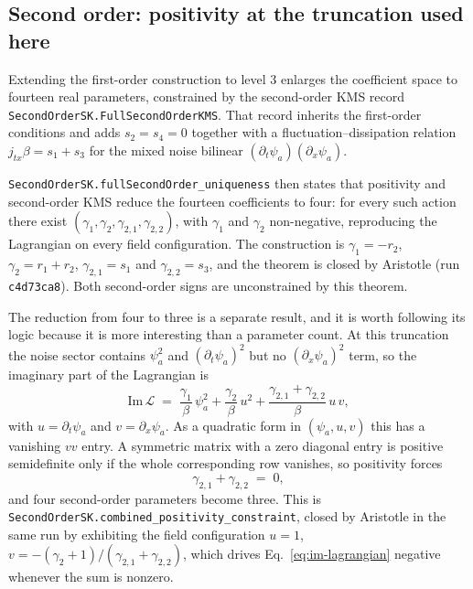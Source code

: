 \documentclass[aps,prd,reprint,nofootinbib,superscriptaddress]{revtex4-2}
\begin{document}
\subsection{Second order: positivity at the truncation used here}
\label{sec:higher-positivity}

Extending the first-order construction to level $3$ enlarges the
coefficient space to fourteen real parameters, constrained by the
second-order KMS record \texttt{SecondOrderSK.FullSecondOrderKMS}. That
record inherits the first-order conditions and adds
$s_2 = s_4 = 0$ together with a fluctuation--dissipation relation
$j_{tx}\beta = s_1 + s_3$ for the mixed noise bilinear
$(\partial_t \psi_a)(\partial_x \psi_a)$.

\texttt{SecondOrderSK.fullSecondOrder\_uniqueness} then states that
positivity and second-order KMS reduce the fourteen coefficients to
four: for every such action there exist
$(\gamma_1, \gamma_2, \gamma_{2,1}, \gamma_{2,2})$, with $\gamma_1$ and
$\gamma_2$ non-negative, reproducing the Lagrangian on every field
configuration. The construction is
$\gamma_1 = -r_2$, $\gamma_2 = r_1 + r_2$, $\gamma_{2,1} = s_1$ and
$\gamma_{2,2} = s_3$, and the theorem is closed by Aristotle
(run \texttt{c4d73ca8}). Both second-order signs are unconstrained by
this theorem.

The reduction from four to three is a separate result, and it is worth
following its logic because it is more interesting than a parameter
count. At this truncation the noise sector contains
$\psi_a^2$ and $(\partial_t \psi_a)^2$ but no $(\partial_x \psi_a)^2$
term, so the imaginary part of the Lagrangian is
\begin{equation}
\mathrm{Im}\,\mathcal{L} \;=\;
  \frac{\gamma_1}{\beta}\,\psi_a^2
  + \frac{\gamma_2}{\beta}\,u^2
  + \frac{\gamma_{2,1}+\gamma_{2,2}}{\beta}\,u\,v ,
\label{eq:im-lagrangian}
\end{equation}
with $u = \partial_t \psi_a$ and $v = \partial_x \psi_a$. As a quadratic
form in $(\psi_a, u, v)$ this has a vanishing $vv$ entry. A symmetric
matrix with a zero diagonal entry is positive semidefinite only if the
whole corresponding row vanishes, so positivity forces
\begin{equation}
\gamma_{2,1} + \gamma_{2,2} \;=\; 0 ,
\label{eq:second-order-relation}
\end{equation}
and four second-order parameters become three. This is
\texttt{SecondOrderSK.combined\_positivity\_constraint}, closed by
Aristotle in the same run by exhibiting the field configuration
$u = 1$, $v = -(\gamma_2+1)/(\gamma_{2,1}+\gamma_{2,2})$, which drives
Eq.~\eqref{eq:im-lagrangian} negative whenever the sum is nonzero.
\end{document}
